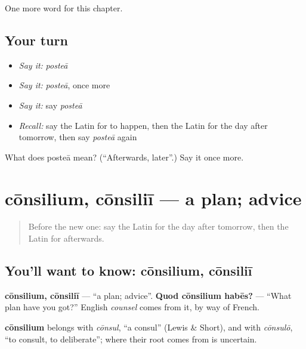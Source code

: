 \begin{grammarlens}[title={What you've built}]
One more word for this chapter.
\end{grammarlens}

\subsection*{Your turn}
\begin{itemize}
\raggedright
  \item \emph{Say it:} \emph{posteā}
  \item \emph{Say it:} \emph{posteā}, once more
  \item \emph{Say it:} say \emph{posteā}
  \item \emph{Recall:} say the Latin for to happen, then the Latin for the day after tomorrow, then say \emph{posteā} again
\end{itemize}

\begin{tcolorbox}[breakable,colback=teal!4,colframe=teal!35!black,title={Before you move on}]
What does posteā mean? (\textquotedblleft{}Afterwards, later\textquotedblright{}.) Say it once more.
\end{tcolorbox}
\section[cōnsilium, cōnsiliī]{cōnsilium, cōnsiliī — a plan; advice}

\label{lesson:LA-C163-consilium}



\begin{quote}
Before the new one: say the Latin for the day after tomorrow, then the Latin for afterwards.
\end{quote}

\subsection*{You'll want to know: cōnsilium, cōnsiliī}
\textbf{cōnsilium, cōnsiliī} — \textquotedblleft{}a plan; advice\textquotedblright{}. \textbf{Quod cōnsilium habēs?} — \textquotedblleft{}What plan have you got?\textquotedblright{} English \emph{counsel} comes from it, by way of French.

\begin{cousinweb}
\textbf{cōnsilium} belongs with \emph{cōnsul}, \textquotedblleft{}a consul\textquotedblright{} (Lewis \& Short), and with \emph{cōnsulō}, \textquotedblleft{}to consult, to deliberate\textquotedblright{}; where their root comes from is uncertain.
\end{cousinweb}

